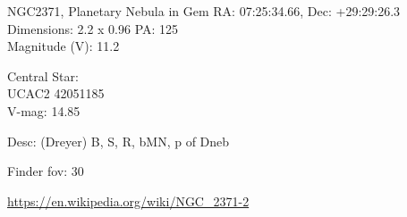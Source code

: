 \begin{block}{NGC2371, Planetary Nebula in Gem}
    RA: 07:25:34.66, Dec: +29:29:26.3 \\ 
    Dimensions: 2.2 x 0.96 PA: 125 \\ 
    Magnitude (V): 11.2

    Central Star: \\ 
      \hspace{1em}UCAC2 42051185 \\ 
      \hspace{1em}V-mag: 14.85 

    Desc: (Dreyer) B, S, R, bMN, p of Dneb 

    Finder fov: 30 

    \url{https://en.wikipedia.org/wiki/NGC_2371-2} 
\end{block}